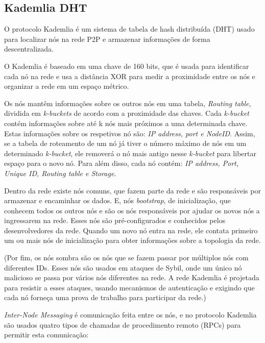 \documentclass[conference]{IEEEtran}
\begin{document}
    \subsection{Kademlia DHT}
    O protocolo Kademlia é um sistema de tabela de hash distribuída (DHT) usado para localizar nós na rede P2P e armazenar informações de forma descentralizada.

    O Kademlia é baseado em uma chave de 160 bits, que é usada para identificar cada nó na rede e usa a distância XOR para medir a proximidade entre os nós e organizar a rede em um espaço métrico.

    Os nós mantêm informações sobre os outros nós em uma tabela, \textit{Routing table}, dividida em \textit{k-buckets} de acordo com a proximidade das chaves. Cada \textit{k-bucket} contém informações sobre até k nós mais próximos a uma determinada chave. Estas informações sobre os respetivos nó são: \textit{IP address, port e NodeID}.
    Assim, se a tabela de roteamento de um nó já tiver o número máximo de nós em um determinado \textit{k-bucket}, ele removerá o nó mais antigo nesse \textit{k-bucket} para libertar espaço para o novo nó.
    Para além disso, cada nó contém: \textit{IP address, Port, Unique ID, Routing table e Storage}.

    Dentro da rede existe nós comuns, que fazem parte da rede e são responsáveis por armazenar e encaminhar os dados. E, nós \textit{bootstrap}, de inicialização, que conhecem todos os outros nós e são os nós responsáveis por ajudar os novos nós a ingressarem na rede. Esses nós são pré-configurados e conhecidos pelos desenvolvedores da rede. Quando um novo nó entra na rede, ele contata primeiro um ou mais nós de inicialização para obter informações sobre a topologia da rede.

    (Por fim, os nós sombra são os nós que se fazem passar por múltiplos nós com diferentes IDs. Esses nós são usados em ataques de Sybil, onde um único nó malicioso se passa por vários nós diferentes na rede. A rede Kademlia é projetada para resistir a esses ataques, usando mecanismos de autenticação e exigindo que cada nó forneça uma prova de trabalho para participar da rede.)

    \textit{Inter-Node Messaging} é comunicação feita entre os nós, e no protocolo Kademlia são usados quatro tipos de chamadas de procedimento remoto (RPCs) para permitir esta comunicação:
\end{document}
